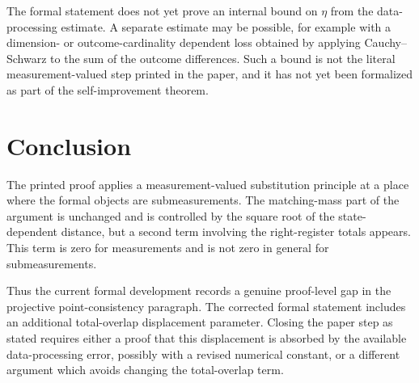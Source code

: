 \documentclass[11pt]{article}
\begin{document}
The formal statement does not yet prove an internal bound on $\eta$ from the
data-processing estimate.  A separate estimate may be possible, for example
with a dimension- or outcome-cardinality dependent loss obtained by applying
Cauchy--Schwarz to the sum of the outcome differences.  Such a bound is not the
literal measurement-valued step printed in the paper, and it has not yet been
formalized as part of the self-improvement theorem.

\section{Conclusion}

The printed proof applies a measurement-valued substitution principle at a
place where the formal objects are submeasurements.  The matching-mass part of
the argument is unchanged and is controlled by the square root of the
state-dependent distance, but a second term involving the right-register totals
appears.  This term is zero for measurements and is not zero in general for
submeasurements.

Thus the current formal development records a genuine proof-level gap in the
projective point-consistency paragraph.  The corrected formal statement includes
an additional total-overlap displacement parameter.  Closing the paper step as
stated requires either a proof that this displacement is absorbed by the
available data-processing error, possibly with a revised numerical constant, or
a different argument which avoids changing the total-overlap term.



\end{document}
